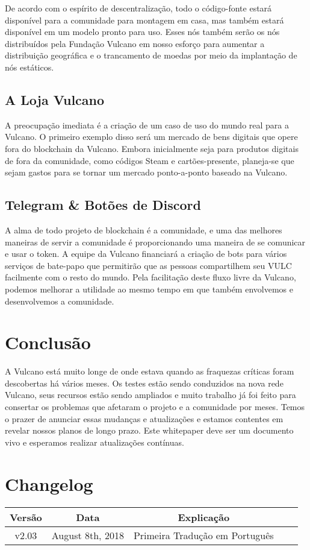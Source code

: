 \documentclass[A4paper, 12pt]{article}
\begin{document}
De acordo com o espírito de descentralização, todo o código-fonte estará disponível para a comunidade para montagem em casa, mas também estará disponível em um modelo pronto para uso. Esses nós também serão os nós distribuídos pela Fundação Vulcano em nosso esforço para aumentar a distribuição geográfica e o trancamento de moedas por meio da implantação de nós estáticos.

\subsection{A Loja Vulcano}
A preocupação imediata é a criação de um caso de uso do mundo real para a Vulcano. O primeiro exemplo disso será um mercado de bens digitais que opere fora do blockchain da Vulcano. Embora inicialmente seja para produtos digitais de fora da comunidade, como códigos Steam e cartões-presente, planeja-se que sejam gastos para se tornar um mercado ponto-a-ponto baseado na Vulcano.

\subsection{Telegram \& Botões de Discord}
A alma de todo projeto de blockchain é a comunidade, e uma das melhores maneiras de servir a comunidade é proporcionando uma maneira de se comunicar e usar o token. A equipe da Vulcano financiará a criação de bots para vários serviços de bate-papo que permitirão que as pessoas compartilhem seu VULC facilmente com o resto do mundo.  Pela facilitação deste fluxo livre da Vulcano, podemos melhorar a utilidade ao mesmo tempo em que também envolvemos e desenvolvemos a comunidade.

\section{Conclusão}
A Vulcano está muito longe de onde estava quando as fraquezas críticas foram descobertas há vários meses. Os testes estão sendo conduzidos na nova rede Vulcano, seus recursos estão sendo ampliados e muito trabalho já foi feito para consertar os problemas que afetaram o projeto e a comunidade por meses.  Temos o prazer de anunciar essas mudanças e atualizações e estamos contentes em revelar nossos planos de longo prazo. Este whitepaper deve ser um documento vivo e esperamos realizar atualizações contínuas.
\newpage
\section{Changelog}

\begin{table}[h]
\centering
\begin{tabular}{@{}ccccc@{}}
\toprule
Versão & Data & Explicação \\ \midrule
v2.03 & August 8th, 2018 & Primeira Tradução em Português \\
 \bottomrule
\end{tabular}
\end{table}
\end{document}
